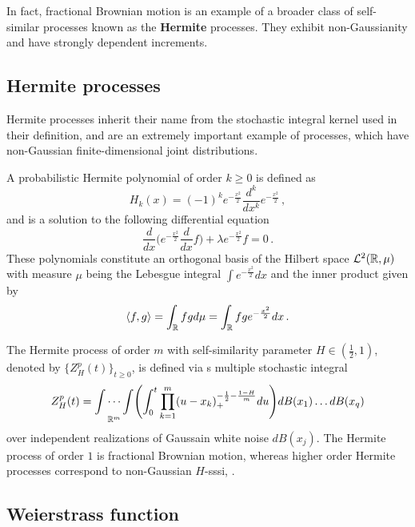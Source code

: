 In fact, fractional Brownian motion is an example of a broader class of self-similar
processes known as the \textbf{Hermite} processes. They exhibit non-Gaussianity and have
strongly dependent increments.


\subsection{Hermite processes} %
\label{sub:hermite_processes}

Hermite processes inherit their name from the stochastic integral kernel used in
their definition, and are an extremely important example of processes, which have 
non-Gaussian finite-dimensional joint distributions.

A probabilistic Hermite polynomial of order $k\geq0$ is defined as 
\[ H_k(x) = (-1)^k e^{-\frac{x^2}{2}} \frac{d^k}{dx^k} e^{-\frac{x^2}{2}} \,,\]
and is a solution to the following differential equation
\[
 \frac{d}{dx}\biggl( e^{-\frac{x^2}{2}} \frac{d}{dx} f\biggr) + \lambda e^{-\frac{x^2}{2}} f = 0 \,.
\]
These polynomials constitute an orthogonal basis of the Hilbert space $\mathcal{L}^2(\mathbb{R}, \mu)$
with measure $\mu$ being the Lebesgue integral $\int e^{-\frac{x^2}{2}} dx$ and the inner
product given by
\[
\langle f, g\rangle = \int_{\mathbb{R}} f g d\mu = \int_{\mathbb{R}} f g e^{-\frac{x^2}{2}} dx \,.
\]

The Hermite process of order $m$ with self-similarity parameter $H\in(\tfrac{1}{2},1)$,
denoted by $\bigl\{Z_H^p(t)\bigr\}_{t\geq 0}$, is defined via s multiple stochastic
integral
\[
Z_H^p(t) = \underset{\mathbb{R}^m}{\int \cdots \int} \Biggl(
\int^t_0 \prod_{k=1}^m (u-x_k)_+^{-\frac{1}{2}-\frac{1-H}{m}} du\Biggr) dB(x_1) \ldots dB(x_q)
\]
over independent realizations of Gaussain white noise $dB(x_j)$. The Hermite process
of order $1$ is fractional Brownian motion, whereas higher order Hermite processes
correspond to non-Gaussian $H$-sssi, \cite{Bai20141710}.


\subsection{Weierstrass function} %
\label{sub:weierstrass_function}

